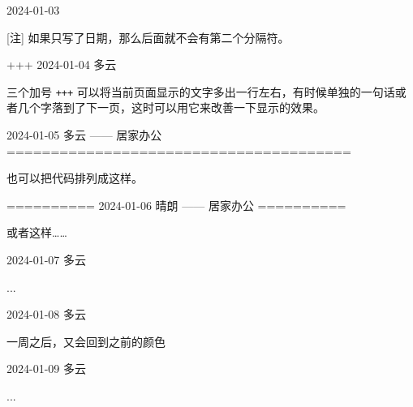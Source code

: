\documentclass[11pt, paperstyle=light yellow, color entry,
  title in boldface, title in sffamily, use style = classical]{jwjournal}
\begin{document}
2024-01-03

  [注] 如果只写了日期，那么后面就不会有第二个分隔符。


+++
2024-01-04  多云

  三个加号 \texttt{+++} 可以将当前页面显示的文字多出一行左右，有时候单独的一句话或者几个字落到了下一页，这时可以用它来改善一下显示的效果。



2024-01-05    多云        —— 居家办公
=======================================

也可以把代码排列成这样。


==========
2024-01-06    晴朗        —— 居家办公
==========

或者这样……



2024-01-07  多云

  ...



2024-01-08  多云

  一周之后，又会回到之前的颜色



2024-01-09  多云

  ...
\end{document}
